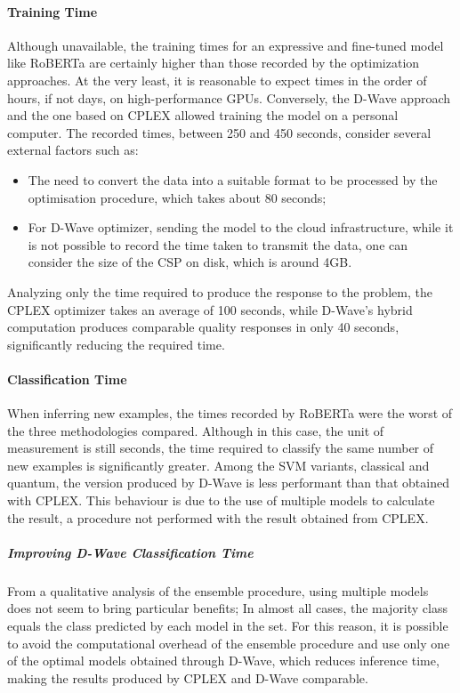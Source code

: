 \paragraph{Training Time} Although unavailable, the training times for an expressive and fine-tuned model like RoBERTa are certainly higher than those recorded by the optimization approaches. 
At the very least, it is reasonable to expect times in the order of hours, if not days, on high-performance GPUs. 
Conversely, the D-Wave approach and the one based on CPLEX allowed training the model on a personal computer. 
The recorded times, between 250 and 450 seconds, consider several external factors such as:
\begin{itemize}
    \item The need to convert the data into a suitable format to be processed by the optimisation procedure, which takes about 80 seconds;
    \item For D-Wave optimizer, sending the model to the cloud infrastructure, while it is not possible to record the time taken to transmit the data, one can consider the size of the CSP on disk, which is around 4GB.  
\end{itemize} 
Analyzing only the time required to produce the response to the problem, the CPLEX optimizer takes an average of 100 seconds, while D-Wave's hybrid computation produces comparable quality responses in only 40 seconds, significantly reducing the required time.

\paragraph{Classification Time} When inferring new examples, the times recorded by RoBERTa were the worst of the three methodologies compared. 
Although in this case, the unit of measurement is still seconds, the time required to classify the same number of new examples is significantly greater. 
Among the SVM variants, classical and quantum, the version produced by D-Wave is less performant than that obtained with CPLEX. 
This behaviour is due to the use of multiple models to calculate the result, a procedure not performed with the result obtained from CPLEX. 

\subparagraph{Improving D-Wave Classification Time} From a qualitative analysis of the ensemble procedure, using multiple models does not seem to bring particular benefits; In almost all cases, the majority class equals the class predicted by each model in the set. 
For this reason, it is possible to avoid the computational overhead of the ensemble procedure and use only one of the optimal models obtained through D-Wave, which reduces inference time, making the results produced by CPLEX and D-Wave comparable.

